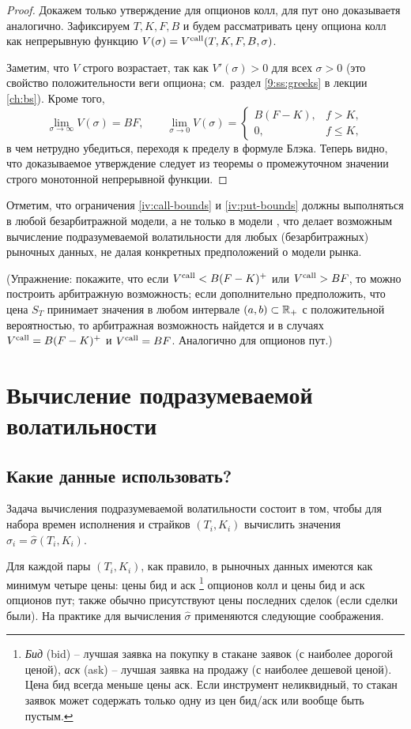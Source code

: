 \begin{proof}
Докажем только утверждение для опционов колл, для пут оно доказываетя аналогично.
Зафиксируем $T,K,F,B$ и будем рассматривать цену опциона колл как непрерывную функцию $V(\sigma) = V^{\text{\normalfont call}}(T,K,F,B,\sigma)$.

Заметим, что $V$ строго возрастает, так как $V'(\sigma)>0$ для всех $\sigma>0$ (это свойство  положительности веги опциона; см.~раздел \ref{9:ss:greeks} в лекции \ref{ch:bs}).
Кроме того, 
\[
\lim_{\sigma\to\infty} V(\sigma) = BF, \qquad
\lim_{\sigma\to 0} V(\sigma) = \begin{cases}
B(F-K), &f > K,\\
0, &f\le K,
\end{cases}
\]
в чем нетрудно убедиться, переходя к пределу в формуле Блэка.
Теперь видно, что доказываемое утверждение следует из теоремы о промежуточном значении строго монотонной непрерывной функции.
\end{proof}

Отметим, что ограничения \eqref{iv:call-bounds} и \eqref{iv:put-bounds} должны выполняться в любой безарбитражной модели, а не только в модели \bs, что делает возможным вычисление подразумеваемой волатильности для любых (безарбитражных) рыночных данных, не далая конкретных предположений о модели рынка.

(Упражнение: покажите, что если $V^{\text{\normalfont call}}<B(F-K)^+$ или $V^{\text{\normalfont call}}> BF$, то можно построить арбитражную возможность; если дополнительно предположить, что цена $S_T$ принимает значения в любом интервале $(a,b)\subset\mathbb{R}_+$ с положительной вероятностью, то арбитражная возможность найдется и в случаях $V^{\text{\normalfont call}}=B(F-K)^+$ и $V^{\text{\normalfont call}}=BF$.
Аналогично для опционов пут.)




\section{Вычисление подразумеваемой волатильности}

\subsection{Какие данные использовать?}

Задача вычисления подразумеваемой волатильности состоит в том, чтобы для набора времен исполнения и страйков $(T_i,K_i)$ вычислить значения $\hat\sigma_i = \hat\sigma(T_i,K_i)$. 

Для каждой пары $(T_i,K_i)$, как правило, в рыночных данных имеются как минимум четыре цены: цены бид и аск%
\footnote{\emph{Бид} (bid) -- лучшая заявка на покупку в стакане заявок (с наиболее дорогой ценой), \emph{аск} (ask) -- лучшая заявка на продажу (с наиболее дешевой ценой). Цена бид всегда меньше цены аск.
Если инструмент неликвидный, то стакан заявок может содержать только одну из цен бид/аск или вообще быть пустым.}
опционов колл и цены бид и аск опционов пут; также обычно присутствуют цены последних сделок (если сделки были).
На практике для вычисления $\hat\sigma$ применяются следующие соображения.

